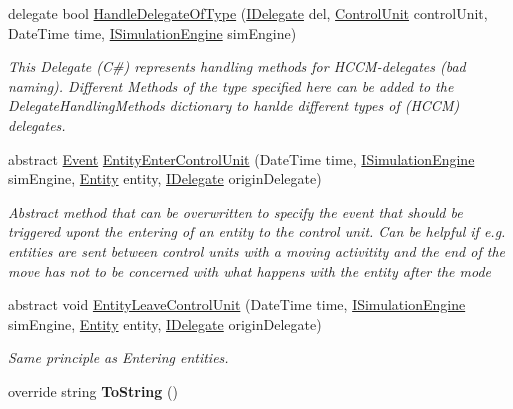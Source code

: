 \begin{DoxyCompactItemize}
delegate bool \hyperlink{class_simulation_core_1_1_h_c_c_m_elements_1_1_control_unit_a3abd3d61b1350ae8a6f502a9f442d05e}{Handle\+Delegate\+Of\+Type} (\hyperlink{interface_simulation_core_1_1_h_c_c_m_elements_1_1_i_delegate}{I\+Delegate} del, \hyperlink{class_simulation_core_1_1_h_c_c_m_elements_1_1_control_unit}{Control\+Unit} control\+Unit, Date\+Time time, \hyperlink{interface_simulation_core_1_1_simulation_classes_1_1_i_simulation_engine}{I\+Simulation\+Engine} sim\+Engine)
\begin{DoxyCompactList}\small\item\em This Delegate (C\#) represents handling methods for H\+C\+C\+M-\/delegates (bad naming). Different Methods of the type specified here can be added to the Delegate\+Handling\+Methods dictionary to hanlde different types of (H\+C\+CM) delegates. \end{DoxyCompactList}\item 
abstract \hyperlink{class_simulation_core_1_1_h_c_c_m_elements_1_1_event}{Event} \hyperlink{class_simulation_core_1_1_h_c_c_m_elements_1_1_control_unit_a5742631a86fd6acafed6852b1359b5a6}{Entity\+Enter\+Control\+Unit} (Date\+Time time, \hyperlink{interface_simulation_core_1_1_simulation_classes_1_1_i_simulation_engine}{I\+Simulation\+Engine} sim\+Engine, \hyperlink{class_simulation_core_1_1_h_c_c_m_elements_1_1_entity}{Entity} entity, \hyperlink{interface_simulation_core_1_1_h_c_c_m_elements_1_1_i_delegate}{I\+Delegate} origin\+Delegate)
\begin{DoxyCompactList}\small\item\em Abstract method that can be overwritten to specify the event that should be triggered upont the entering of an entity to the control unit. Can be helpful if e.\+g. entities are sent between control units with a moving activitity and the end of the move has not to be concerned with what happens with the entity after the mode \end{DoxyCompactList}\item 
abstract void \hyperlink{class_simulation_core_1_1_h_c_c_m_elements_1_1_control_unit_a32866bb8f6d32b32056428eeff633198}{Entity\+Leave\+Control\+Unit} (Date\+Time time, \hyperlink{interface_simulation_core_1_1_simulation_classes_1_1_i_simulation_engine}{I\+Simulation\+Engine} sim\+Engine, \hyperlink{class_simulation_core_1_1_h_c_c_m_elements_1_1_entity}{Entity} entity, \hyperlink{interface_simulation_core_1_1_h_c_c_m_elements_1_1_i_delegate}{I\+Delegate} origin\+Delegate)
\begin{DoxyCompactList}\small\item\em Same principle as Entering entities. \end{DoxyCompactList}\item 
override string {\bfseries To\+String} ()\hypertarget{class_simulation_core_1_1_h_c_c_m_elements_1_1_control_unit_a089ede9bd9387b9384eefa4de1bef21d}{}\label{class_simulation_core_1_1_h_c_c_m_elements_1_1_control_unit_a089ede9bd9387b9384eefa4de1bef21d}

\end{DoxyCompactItemize}

